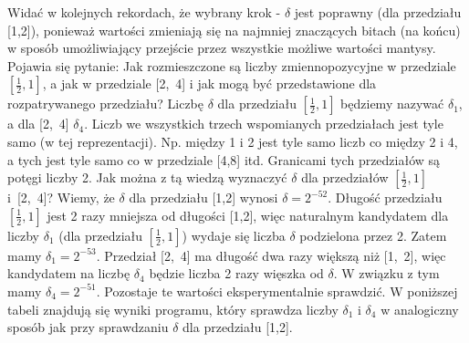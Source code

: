 \documentclass[]{article}
\begin{document}
	Widać w kolejnych rekordach, że wybrany krok - $\delta$ jest poprawny (dla przedziału [1,2]), ponieważ wartości zmieniają się na najmniej znaczących bitach (na końcu) w sposób umożliwiający przejście przez wszystkie możliwe wartości mantysy. \newline 
	Pojawia się pytanie: Jak rozmieszczone są liczby zmiennopozycyjne w przedziale \([\frac{1}{2},1]\), a jak w przedziale \mbox{[2, 4]} i jak
	mogą być przedstawione dla rozpatrywanego przedziału? \newline
	Liczbę $\delta$ dla przedziału \([\frac{1}{2},1]\) będziemy nazywać $\delta_1$, a dla \mbox{[2, 4]}  $\delta_4$. Liczb we wszystkich trzech wspomianych przedziałach jest tyle samo (w tej reprezentacji). Np. między 1 i 2 jest tyle samo liczb co między 2 i 4, a tych jest tyle samo co w przedziale [4,8] itd. Granicami tych przedziałów są potęgi liczby 2. Jak można z tą wiedzą wyznaczyć $\delta$ dla przedziałów  \([\frac{1}{2},1]\) \mbox{i [2, 4]?} Wiemy, że $\delta$ dla przedziału [1,2] wynosi \(\delta = 2^{-52}\). Długość przedziału \([\frac{1}{2},1]\) jest 2 razy mniejsza od długości [1,2], więc naturalnym kandydatem dla liczby $\delta_1$ (dla przedziału \([\frac{1}{2},1]\)) wydaje się liczba $\delta$ podzielona przez 2. Zatem mamy \(\delta_1 = 2^{-53}\). \newline 
	Przedział \mbox{[2, 4]} ma długość dwa razy większą niż \mbox{[1, 2]}, więc kandydatem na liczbę $\delta_4$ będzie liczba 2 razy więszka od $\delta$. W związku z tym mamy \(\delta_4 = 2^{-51}\).
	Pozostaje te wartości eksperymentalnie sprawdzić. W poniższej tabeli znajdują się wyniki programu, który sprawdza liczby $\delta_1$ i $\delta_4$ w analogiczny sposób jak przy sprawdzaniu $\delta$ dla przedziału \mbox{[1,2]}.
	
\end{document}

